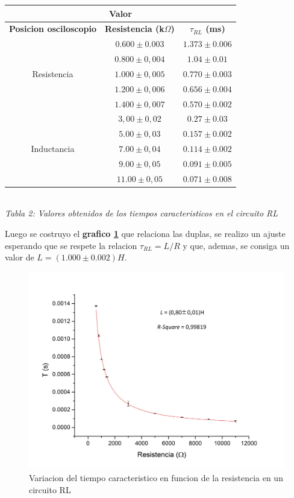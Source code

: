 \documentclass[11pt,a4paper]{article}
\begin{document}
\begin{center}
\begin{tabular}{||c|c|c||}
\hline
\multicolumn{3}{||c||}{\textbf{Valor}} \\ \hline
\textbf{Posicion osciloscopio} & \textbf{Resistencia (k$\Omega$)} & \textbf{$\tau_{RL}$ (ms)}\\ \hline 
\multirow {5}{2cm}{Resistencia} & $0.600\pm0.003$ & $1.373 \pm 0.006$ \\ \cline {2-3}
& $0.800\pm0,004$ & $1.04\pm 0.01$ \\ \cline {2-3} 
& $1.000\pm0,005$ & $0.770 \pm 0.003$ \\ \cline {2-3}
& $1.200\pm0,006$ & $0.656 \pm 0.004$ \\ \cline {2-3}
& $1.400\pm0,007$ & $0.570 \pm 0.002$ \\ \hline
\multirow {5}{2cm}{Inductancia} & $3,00\pm0,02$ & $0.27 \pm 0.03$ \\ \cline {2-3}
& $5.00\pm0,03$ & $0.157 \pm 0.002$ \\ \cline {2-3}
& $7.00\pm0,04$ & $0.114 \pm 0.002$ \\ \cline {2-3}
& $9.00\pm0,05$ & $0.091 \pm 0.005$ \\ \cline {2-3} 
& $11.00\pm0,05$ & $0.071 \pm 0.008$ \\ \hline
\end{tabular}\\[0.3cm]

 \textit{Tabla 2: Valores obtenidos de los tiempos caracteristicos en el circuito RL}
\end{center}

Luego se costruyo el \textbf{grafico \ref{fig:T-RL}} que relaciona las duplas, se realizo un ajuste esperando que se respete la relacion $\tau_{RL} = L/R$ y que, ademas, se consiga un valor de $L = (1.000 \pm 0.002) H$.

\begin{figure}[H]
\centering
\includegraphics[scale=0.4]{TauRCvsR_Todo_en_Serie}
  \caption{Variacion del tiempo caracteristico en funcion de la resistencia en un circuito RL}
  \label{fig:T-RL}
\end{figure}
\end{document}
